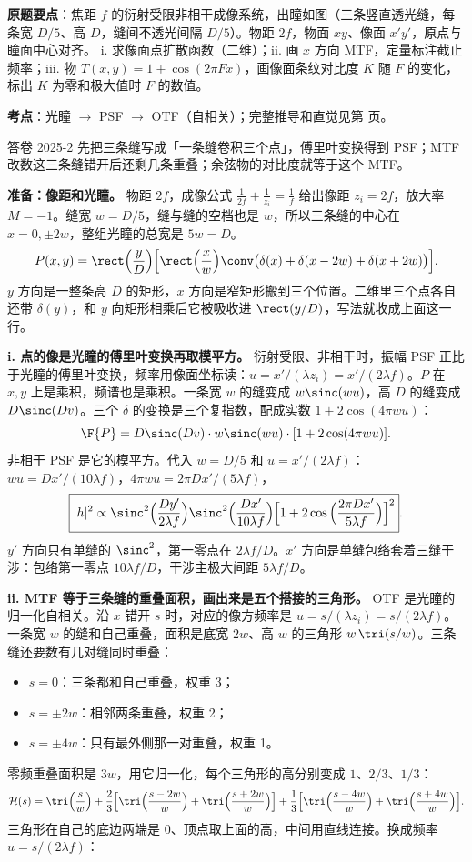 \noindent\textbf{原题要点}：焦距 $f$ 的衍射受限非相干成像系统，出瞳如图（三条竖直透光缝，每条宽 $D/5$、高 $D$，缝间不透光间隔 $D/5$）。物距 $2f$，物面 $xy$、像面 $x'y'$，原点与瞳面中心对齐。
i. 求像面点扩散函数（二维）；ii. 画 $x$ 方向 MTF，定量标注截止频率；iii. 物 $T(x,y)=1+\cos(2\pi Fx)$，画像面条纹对比度 $K$ 随 $F$ 的变化，标出 $K$ 为零和极大值时 $F$ 的数值。

\textbf{考点}：光瞳 $\to$ PSF $\to$ OTF（自相关）；完整推导和直觉见第 \pageref{ex:3slit} 页。

\begin{exam}{答卷 2025-2}
先把三条缝写成「一条缝卷积三个点」，傅里叶变换得到 PSF；MTF 改数这三条缝错开后还剩几条重叠；余弦物的对比度就等于这个 MTF。

\textbf{准备：像距和光瞳。}
物距 $2f$，成像公式 $\frac1{2f}+\frac1{z_i}=\frac1f$ 给出像距 $z_i=2f$，放大率 $M=-1$。缝宽 $w=D/5$，缝与缝的空档也是 $w$，所以三条缝的中心在 $x=0,\pm2w$，整组光瞳的总宽是 $5w=D$。
\[
P(x,y)=\rect\Big(\frac yD\Big)\Big[\rect\Big(\frac xw\Big)\conv\big(\delta(x)+\delta(x-2w)+\delta(x+2w)\big)\Big].
\]
$y$ 方向是一整条高 $D$ 的矩形，$x$ 方向是窄矩形搬到三个位置。二维里三个点各自还带 $\delta(y)$，和 $y$ 向矩形相乘后它被吸收进 $\rect(y/D)$，写法就收成上面这一行。

\textbf{i. 点的像是光瞳的傅里叶变换再取模平方。}
衍射受限、非相干时，振幅 PSF 正比于光瞳的傅里叶变换，频率用像面坐标读：$u=x'/(\lambda z_i)=x'/(2\lambda f)$。$P$ 在 $x,y$ 上是乘积，频谱也是乘积。一条宽 $w$ 的缝变成 $w\sinc(wu)$，高 $D$ 的缝变成 $D\sinc(Dv)$。三个 $\delta$ 的变换是三个复指数，配成实数 $1+2\cos(4\pi wu)$：
\[
\F\{P\}=D\sinc(Dv)\cdot w\sinc(wu)\cdot[1+2\cos(4\pi wu)] .
\]
非相干 PSF 是它的模平方。代入 $w=D/5$ 和 $u=x'/(2\lambda f)$：$wu=Dx'/(10\lambda f)$，$4\pi wu=2\pi Dx'/(5\lambda f)$，
\[
\boxed{|h|^2\propto\sinc^2\Big(\frac{Dy'}{2\lambda f}\Big)\sinc^2\Big(\frac{Dx'}{10\lambda f}\Big)\Big[1+2\cos\Big(\frac{2\pi Dx'}{5\lambda f}\Big)\Big]^2} .
\]
$y'$ 方向只有单缝的 $\sinc^2$，第一零点在 $2\lambda f/D$。$x'$ 方向是单缝包络套着三缝干涉：包络第一零点 $10\lambda f/D$，干涉主极大间距 $5\lambda f/D$。

\textbf{ii. MTF 等于三条缝的重叠面积，画出来是五个搭接的三角形。}
OTF 是光瞳的归一化自相关。沿 $x$ 错开 $s$ 时，对应的像方频率是 $u=s/(\lambda z_i)=s/(2\lambda f)$。一条宽 $w$ 的缝和自己重叠，面积是底宽 $2w$、高 $w$ 的三角形 $w\,\tri(s/w)$。三条缝还要数有几对缝同时重叠：
\begin{itemize}
\item $s=0$：三条都和自己重叠，权重 3；
\item $s=\pm2w$：相邻两条重叠，权重 2；
\item $s=\pm4w$：只有最外侧那一对重叠，权重 1。
\end{itemize}
零频重叠面积是 $3w$，用它归一化，每个三角形的高分别变成 $1$、$2/3$、$1/3$：
\[
\mathcal H(s)=\tri\Big(\frac sw\Big)+\frac23\Big[\tri\Big(\frac{s-2w}w\Big)+\tri\Big(\frac{s+2w}w\Big)\Big]+\frac13\Big[\tri\Big(\frac{s-4w}w\Big)+\tri\Big(\frac{s+4w}w\Big)\Big].
\]
三角形在自己的底边两端是 0、顶点取上面的高，中间用直线连接。换成频率 $u=s/(2\lambda f)$：


\end{exam}
